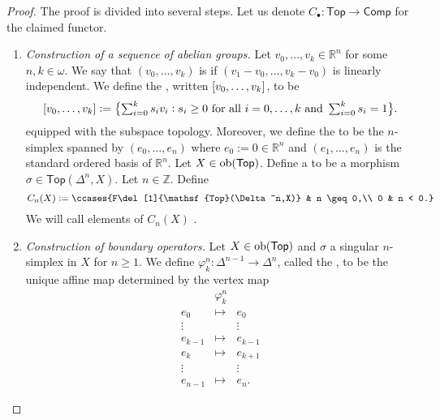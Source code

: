 \begin{proof}
	The proof is divided into several steps. Let us denote $C_\bullet : \mathsf{Top} \to \mathsf{Comp}$ for the claimed functor.
	\begin{enumerate}[label = \textit{Step \arabic*:},wide = 0pt, itemsep = 1.5ex]
		\item \textit{Construction of a sequence of abelian groups.} Let $v_0,\dots,v_k \in \mathbb{R}^n$ for some $n,k \in \omega$. We say that $(v_0,\dots,v_k)$ is  if $(v_1 - v_0,\dots, v_k - v_0)$ is linearly independent. We define the , written $\sbr[0]{v_0,\dots,v_k}$, to be
			\begin{equation}
				\textstyle{\sbr[0]{v_0,\dots,v_k} := \cbr[1]{\sum_{i = 0}^k s_i v_i : s_i \geq 0 \text{ for all } i = 0,\dots,k \text{ and } \sum_{i = 0}^k s_i = 1}}.
			\end{equation}
			\noindent equipped with the subspace topology. Moreover, we define the  to be the $n$-simplex spanned by $(e_0,\dots,e_n)$ where $e_0 := 0 \in \mathbb{R}^n$ and $(e_1,\dots,e_n)$ is the standard ordered basis of $\mathbb{R}^n$. Let $X \in \operatorname{ob}(\mathsf{Top})$. Define a  to be a morphism $\sigma \in \mathsf{Top}(\Delta^n,X)$. Let $n \in \mathbb{Z}$. Define
			\begin{equation}
				C_n(X) := \ccases{F\del[1]{\mathsf{Top}(\Delta^n,X)} & n \geq 0,\\
									0 & n < 0.}
			\end{equation}
			We will call elements of $C_n(X)$ .
		\item \textit{Construction of boundary operators.} Let $X \in \operatorname{ob}(\mathsf{Top})$ and $\sigma$ a singular $n$-simplex in $X$ for $n \geq 1$. We define $\varphi^n_k : \Delta^{n-1} \to \Delta^n$, called the , to be the unique affine map determined by the vertex map
			\begin{equation*}
				\begin{matrix}
					& \varphi_k^n\\
					e_0 & \mapsto & e_0\\
					\vdots & & \vdots\\
					e_{k - 1} & \mapsto & e_{k - 1}\\
					e_k & \mapsto & e_{k + 1}\\
					\vdots & & \vdots\\
					e_{n - 1} & \mapsto & e_n.
				\end{matrix}

\end{equation*}
\end{enumerate}
\end{proof}
